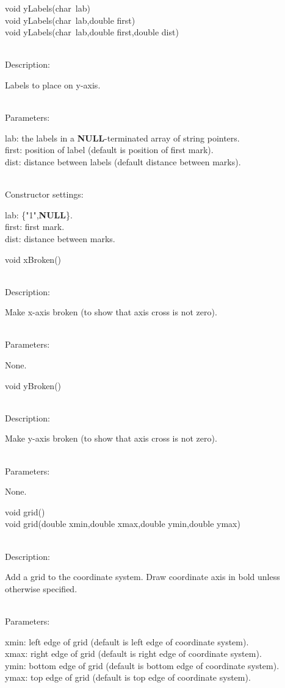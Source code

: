 \documentclass[12pt,a4paper]{article}
\newcommand{\memberitem}[1]{
                              \vspace{-0.5pc}
                              \end{minipage}\\
                              \phantom{M}#1:\\
                              \phantom{MM}
                              \begin{minipage}[t]{12cm}

                           }
\newcommand{\memdsc}{\memberitem{Description}}
\newcommand{\meminp}{\memberitem{Parameters}}
\newcommand{\memdef}{\memberitem{Constructor settings}}
\newenvironment{MemberDescr}
  {
    \begin{minipage}{15cm}
    \bf
  }
  {
    \end{minipage}
  }
\newcommand{\ppntr}{\raisebox{-0.25em}{**}\ }
\begin{document}
  \begin{MemberDescr}
    void yLabels(char\ppntr lab)\\
    void yLabels(char\ppntr lab,double first)\\
    void yLabels(char\ppntr lab,double first,double dist)\\
    \memdsc
      Labels to place on y-axis.\\
    \meminp
      lab:   the labels in a \textbf{NULL}-terminated array of string pointers.\\
      first: position of label (default is position of first mark).\\
      dist:  distance between labels (default distance between marks).\\
    \memdef
      lab: \{"1",\textbf{NULL}\}.\\
      first: first mark.\\
      dist: distance between marks.\\
  \end{MemberDescr}

  \begin{MemberDescr}
    void xBroken()\\
    \memdsc
      Make x-axis broken (to show that axis cross is not zero).\\
    \meminp
      None.\\
  \end{MemberDescr}

  \begin{MemberDescr}
    void yBroken()\\
    \memdsc
      Make y-axis broken (to show that axis cross is not zero).\\
    \meminp
      None.\\
  \end{MemberDescr}

  \begin{MemberDescr}
    void grid()\\
    void grid(double xmin,double xmax,double ymin,double ymax)\\
    \memdsc
      Add a grid to the coordinate system. Draw coordinate axis in bold unless
      otherwise specified.\\
    \meminp
      xmin: left edge of grid (default is left edge of coordinate system).\\
      xmax: right edge of grid (default is right edge of coordinate system).\\
      ymin: bottom edge of grid (default is bottom edge of coordinate system).\\
      ymax: top edge of grid (default is top edge of coordinate system).\\
  \end{MemberDescr}
\end{document}
